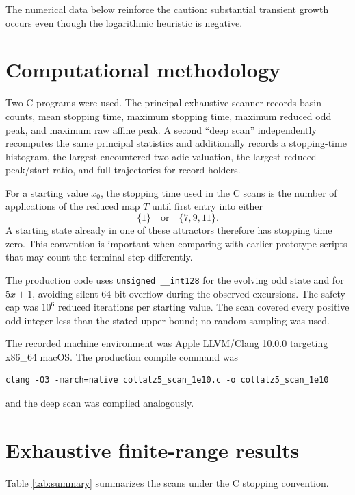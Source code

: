 \documentclass[11pt]{article}
\begin{document}
The numerical data below reinforce the caution: substantial transient growth occurs even though the logarithmic heuristic is negative.

\section{Computational methodology}

Two C programs were used. The principal exhaustive scanner records basin counts, mean stopping time, maximum stopping time, maximum reduced odd peak, and maximum raw affine peak. A second ``deep scan'' independently recomputes the same principal statistics and additionally records a stopping-time histogram, the largest encountered two-adic valuation, the largest reduced-peak/start ratio, and full trajectories for record holders.

For a starting value \(x_0\), the stopping time used in the C scans is the number of applications of the reduced map \(T\) until first entry into either
\[
\{1\}
\quad\text{or}\quad
\{7,9,11\}.
\]
A starting state already in one of these attractors therefore has stopping time zero. This convention is important when comparing with earlier prototype scripts that may count the terminal step differently.

The production code uses \texttt{unsigned \_\_int128} for the evolving odd state and for \(5x\pm1\), avoiding silent 64-bit overflow during the observed excursions. The safety cap was \(10^6\) reduced iterations per starting value. The scan covered every positive odd integer less than the stated upper bound; no random sampling was used.

The recorded machine environment was Apple LLVM/Clang 10.0.0 targeting x86\_64 macOS. The production compile command was
\begin{verbatim}
clang -O3 -march=native collatz5_scan_1e10.c -o collatz5_scan_1e10
\end{verbatim}
and the deep scan was compiled analogously.

\section{Exhaustive finite-range results}

Table \ref{tab:summary} summarizes the scans under the C stopping convention.
\end{document}
